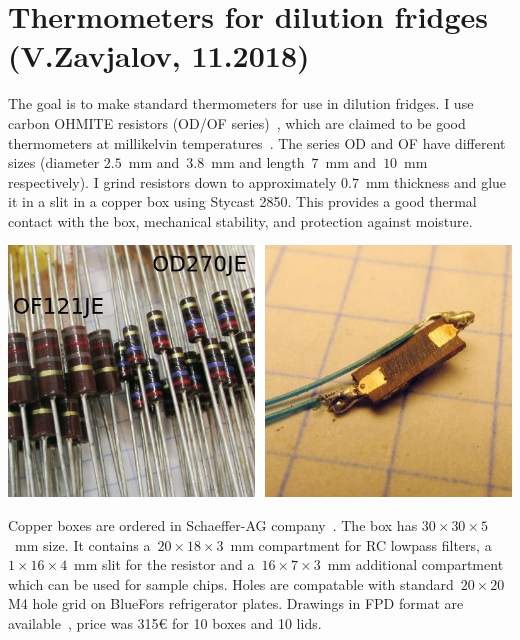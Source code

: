 \documentclass[a4paper]{article}
\begin{document}
\section*{Thermometers for dilution fridges (V.Zavjalov, 11.2018)}

The goal is to make standard thermometers for use in dilution fridges. I
use carbon OHMITE resistors (OD/OF series)~\cite{ohmite_catalog}, which
are claimed to be good thermometers at millikelvin
temperatures~\cite{therm_paper}. The series OD and OF have different
sizes (diameter $2.5$~mm and~$3.8$~mm and length~$7$~mm and~$10$~mm
respectively). I grind resistors down to approximately $0.7$~mm thickness
and glue it in a slit in a copper box using Stycast 2850. This provides
a good thermal contact with the box, mechanical stability, and protection
against moisture.

\begin{center}
\includegraphics[width=\linewidth]{img/res.jpg}
\end{center}

Copper boxes are ordered in Schaeffer-AG company~\cite{schaeffer}.  The
box has $30\times30\times5$~mm size. It contains a~$20\times18\times3$~mm
compartment for RC lowpass filters, a $1\times16\times4$~mm slit for the
resistor and a~$16\times7\times3$~mm additional compartment which can be
used for sample chips. Holes are compatable with standard~$20\times20$ M4
hole grid on BlueFors refrigerator plates. Drawings in FPD format are
available~\cite{box_drawings}, price was 315\euro{} for 10 boxes and 10
lids.
\end{document}
